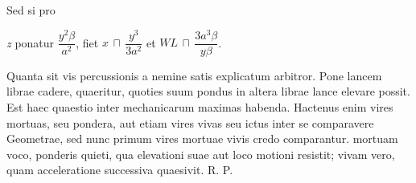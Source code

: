 \newpage
\pstart
Sed si pro \rule[-4mm]{0mm}{10mm}\textit{z} ponatur \( \displaystyle \dfrac{y^{2}\beta}{a^{2}}  \), fiet \( \displaystyle x \, \sqcap \, \dfrac{y^{3}}{3a^{2}}  \) et \( \displaystyle WL \, \sqcap \, \dfrac{3a^{3}\beta}{y\beta}\).\rule[-4mm]{0mm}{10mm} Quanta sit vis percussionis\protect{} a nemine satis explicatum arbitror. Pone %
{}
lancem\protect{} librae\protect{} cadere, quaeritur, quoties suum pondus in altera librae lance elevare possit. Est haec quaestio inter mechanicarum maximas habenda. Hactenus enim vires mortuas\protect{}, seu pondera, aut etiam vires vivas\protect{} seu ictus\protect{} inter se comparavere Geometrae, sed nunc primum vires mortuae\protect{} vivis\protect{} credo comparan\-tur.  mortuam\protect{} voco, ponderis quieti, qua ele\-va\-tioni suae aut loco motioni resistit; vivam\protect{} vero, quam acceleratione successiva quaesivit. R. P. 
